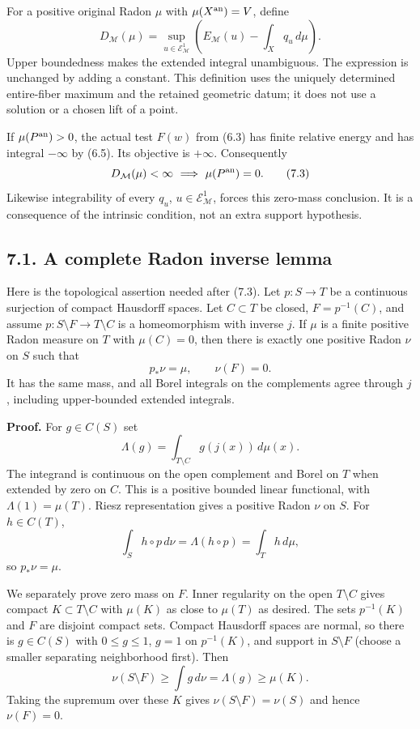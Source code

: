 \documentclass[
  10pt,
]{article}
\begin{document}
For a positive original Radon \(\mu\) with \(\mu(X^{\rm an})=V\), define
\[
 D_{\mathcal M}(\mu)=\sup_{u\in\mathcal E^1_{\mathcal M}}
       \left(E_{\mathcal M}(u)-\int_Xq_u\,d\mu\right).
 \tag{7.2}
\] Upper boundedness makes the extended integral unambiguous. The
expression is unchanged by adding a constant. This definition uses the
uniquely determined entire-fiber maximum and the retained geometric
datum; it does not use a solution or a chosen lift of a point.

If \(\mu(P^{\rm an})>0\), the actual test \(F(w)\) from (6.3) has finite
relative energy and has integral \(-\infty\) by (6.5). Its objective is
\(+\infty\). Consequently \[
 D_{\mathcal M}(\mu)<\infty\ \Longrightarrow\ \mu(P^{\rm an})=0.
 \tag{7.3}
\] Likewise integrability of every \(q_u\),
\(u\in\mathcal E^1_{\mathcal M}\), forces this zero-mass conclusion. It
is a consequence of the intrinsic condition, not an extra support
hypothesis.

\subsection{7.1. A complete Radon inverse
lemma}\label{a-complete-radon-inverse-lemma}

Here is the topological assertion needed after (7.3). Let \(p:S\to T\)
be a continuous surjection of compact Hausdorff spaces. Let
\(C\subset T\) be closed, \(F=p^{-1}(C)\), and assume
\(p:S\setminus F\to T\setminus C\) is a homeomorphism with inverse
\(j\). If \(\mu\) is a finite positive Radon measure on \(T\) with
\(\mu(C)=0\), then there is exactly one positive Radon \(\nu\) on \(S\)
such that \[
 p_*\nu=\mu,\qquad \nu(F)=0.
 \tag{7.4}
\] It has the same mass, and all Borel integrals on the complements
agree through \(j\), including upper-bounded extended integrals.

\textbf{Proof.} For \(g\in C(S)\) set \[
 \Lambda(g)=\int_{T\setminus C}g(j(x))\,d\mu(x).
\] The integrand is continuous on the open complement and Borel on \(T\)
when extended by zero on \(C\). This is a positive bounded linear
functional, with \(\Lambda(1)=\mu(T)\). Riesz representation gives a
positive Radon \(\nu\) on \(S\). For \(h\in C(T)\), \[
 \int_S h\circ p\,d\nu=\Lambda(h\circ p)=\int_T h\,d\mu,
\] so \(p_*\nu=\mu\).

We separately prove zero mass on \(F\). Inner regularity on the open
\(T\setminus C\) gives compact \(K\subset T\setminus C\) with \(\mu(K)\)
as close to \(\mu(T)\) as desired. The sets \(p^{-1}(K)\) and \(F\) are
disjoint compact sets. Compact Hausdorff spaces are normal, so there is
\(g\in C(S)\) with \(0\leq g\leq1\), \(g=1\) on \(p^{-1}(K)\), and
support in \(S\setminus F\) (choose a smaller separating neighborhood
first). Then \[
 \nu(S\setminus F)\geq\int g\,d\nu=\Lambda(g)\geq\mu(K).
\] Taking the supremum over these \(K\) gives
\(\nu(S\setminus F)=\nu(S)\) and hence \(\nu(F)=0\).
\end{document}
